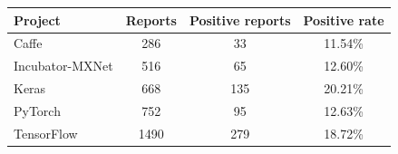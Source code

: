 \begin{tabular}{lccc}
\toprule
Project & Reports & Positive reports & Positive rate \\
\midrule
Caffe & 286 & 33 & 11.54\% \\
Incubator-MXNet & 516 & 65 & 12.60\% \\
Keras & 668 & 135 & 20.21\% \\
PyTorch & 752 & 95 & 12.63\% \\
TensorFlow & 1490 & 279 & 18.72\% \\
\bottomrule
\end{tabular}
